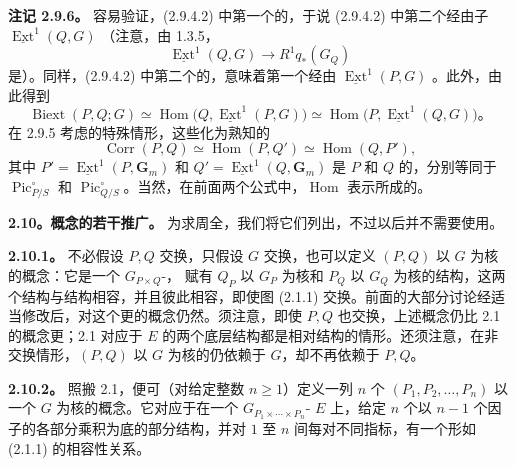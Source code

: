 \textbf{注记 2.9.6。} 容易验证，(2.9.4.2) 中第一个的，于说 (2.9.4.2) 中第二个经由子 $\underline{\operatorname{Ext}}^1(Q,G)$ （注意，由 1.3.5，
\[
\underline{\operatorname{Ext}}^1(Q,G)\longrightarrow R^1q_*(G_Q)
\]
是）。同样，(2.9.4.2) 中第二个的，意味着第一个经由 $\underline{\operatorname{Ext}}^1(P,G)$ 。此外，由此得到
\[
\operatorname{Biext}(P,Q;G)\simeq\operatorname{Hom}\bigl(Q,\underline{\operatorname{Ext}}^1(P,G)\bigr)
\simeq\operatorname{Hom}\bigl(P,\underline{\operatorname{Ext}}^1(Q,G)\bigr)。\tag{2.9.6.1}
\]
在 2.9.5 考虑的特殊情形，这些化为熟知的
\[
\operatorname{Corr}(P,Q)\simeq\operatorname{Hom}(P,Q')\simeq\operatorname{Hom}(Q,P'),\tag{2.9.6.2}
\]
其中 $P'=\underline{\operatorname{Ext}}^1(P,\mathbf G_m)$ 和 $Q'=\underline{\operatorname{Ext}}^1(Q,\mathbf G_m)$ 是 $P$ 和 $Q$ 的，分别等同于 $\operatorname{Pic}^\circ_{P/S}$ 和 $\operatorname{Pic}^\circ_{Q/S}$。当然，在前面两个公式中，$\operatorname{Hom}$ 表示所成的。

\textbf{2.10。概念的若干推广。} 为求周全，我们将它们列出，不过以后并不需要使用。

\textbf{2.10.1。} 不必假设 $P,Q$ 交换，只假设 $G$ 交换，也可以定义 $(P,Q)$ 以 $G$ 为核的概念：它是一个 $G_{P\times Q}$-，
赋有 $Q_P$ 以 $G_P$ 为核和 $P_Q$ 以 $G_Q$ 为核的结构，这两个结构与结构相容，并且彼此相容，即使图 (2.1.1) 交换。前面的大部分讨论经适当修改后，对这个更的概念仍然。须注意，即使 $P,Q$ 也交换，上述概念仍比 2.1 的概念更；2.1 对应于 $E$ 的两个底层结构都是相对结构的情形。还须注意，在非交换情形，$(P,Q)$ 以 $G$ 为核的仍依赖于 $G$，却不再依赖于 $P,Q$。

\textbf{2.10.2。} 照搬 2.1，便可（对给定整数 $n\geq1$）定义一列 $n$ 个 $(P_1,P_2,\ldots,P_n)$ 以一个 $G$ 为核的概念。它对应于在一个 $G_{P_1\times\cdots\times P_n}$- $E$ 上，给定 $n$ 个以 $n-1$ 个因子的各部分乘积为底的部分结构，并对 $1$ 至 $n$ 间每对不同指标，有一个形如 (2.1.1) 的相容性关系。

